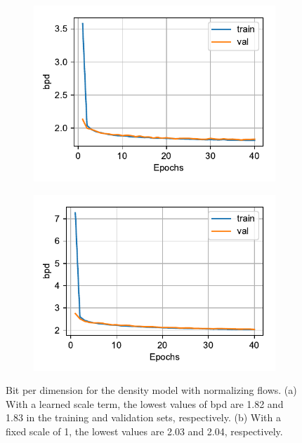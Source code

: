 \documentclass{article}
\begin{document}
\begin{figure}[t]
\begin{subfigure}{0.49\textwidth}
\centering
\includegraphics[scale=0.72]{img/nf_curves_default.pdf}
\caption{}
\end{subfigure}
\begin{subfigure}{0.49\textwidth}
\centering
\includegraphics[scale=0.72]{img/nf_curves_noscale.pdf}
\caption{}
\end{subfigure}
 \caption{Bit per dimension for the density model with normalizing flows. (a) With a learned scale term, the lowest values of bpd are 1.82 and 1.83 in the training and validation sets, respectively. (b) With a fixed scale of 1, the lowest values are 2.03 and 2.04, respectively.}
\label{fig:nf_curves}
\end{figure}
\end{document}
